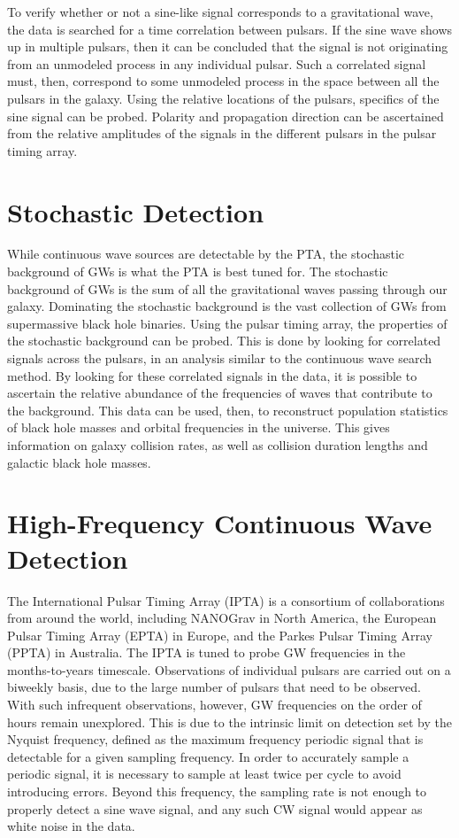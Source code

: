 \documentclass[12pt]{article}
\begin{document}
To verify whether or not a sine-like signal corresponds to a gravitational wave,
the data is searched for a time correlation between pulsars. If the sine wave
shows up in multiple pulsars, then it can be concluded that the signal is not
originating from an unmodeled process in any individual pulsar. Such a
correlated signal must, then, correspond to some unmodeled process in the space
between all the pulsars in the galaxy. Using the relative locations of the
pulsars, specifics of the sine signal can be probed. Polarity and propagation
direction can be ascertained from the relative amplitudes of the signals in the
different pulsars in the pulsar timing array.

\section{Stochastic Detection}
While continuous wave sources are detectable by the PTA, the stochastic
background of GWs is what the PTA is best tuned for. The
stochastic background of GWs is the sum of all the gravitational
waves passing through our galaxy. Dominating the stochastic background is the
vast collection of GWs from supermassive black hole binaries.
Using the pulsar timing array, the properties of the stochastic background can
be probed. This is done by looking for correlated signals across the pulsars, in
an analysis similar to the continuous wave search method. By looking for these
correlated signals in the data, it is possible to ascertain the relative
abundance of the frequencies of waves that contribute to the background. This
data can be used, then, to reconstruct population statistics of black hole masses
and orbital frequencies in the universe. This gives information on galaxy
collision rates, as well as collision duration lengths and galactic black hole masses.

\section{High-Frequency Continuous Wave Detection}

The International Pulsar Timing Array (IPTA) is a consortium of collaborations
from around the world, including NANOGrav in North America, the European Pulsar
Timing Array (EPTA) in Europe, and the Parkes Pulsar Timing Array (PPTA) in
Australia. The IPTA is tuned to probe GW frequencies in the months-to-years
timescale. Observations of individual pulsars are carried out on a biweekly
basis, due to the large number of pulsars that need to be observed. With such
infrequent observations, however, GW frequencies on the order of hours remain
unexplored. This is due to the intrinsic limit on detection set by the Nyquist
frequency, defined as the maximum frequency periodic signal that is detectable
for a given sampling frequency. In order to accurately sample a periodic signal,
it is necessary to sample at least twice per cycle to avoid introducing errors.
Beyond this frequency, the sampling rate is not enough to properly detect a sine
wave signal, and any such CW signal would appear as white noise in the data.
\end{document}
